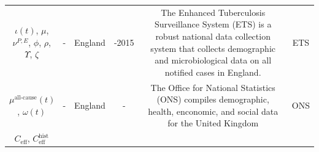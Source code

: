 \documentclass[11pt,twoside]{bristolthesis}
\begin{document}
\begin{longtable}[]{@{}cccccc@{}}
  \midrule
  \endhead
  \begin{minipage}[t]{0.21\columnwidth}\centering
  \(\iota(t)\),
  \(\mu\), \(\nu^{P, E}\), \(\phi\),
  \(\rho\),
  \(\Upsilon\),
  \(\zeta\)\strut
  \end{minipage} & \begin{minipage}[t]{0.10\columnwidth}\centering
  -\strut
  \end{minipage} & \begin{minipage}[t]{0.07\columnwidth}\centering
  England\strut
  \end{minipage} & \begin{minipage}[t]{0.07\columnwidth}\centering
  2000-2015\strut
  \end{minipage} & \begin{minipage}[t]{0.27\columnwidth}\centering
  The Enhanced Tuberculosis Surveillance
  System (ETS) is a robust national data
  collection system that collects
  demographic and microbiological data on
  all notified cases in England.\strut
  \end{minipage} & \begin{minipage}[t]{0.11\columnwidth}\centering
  ETS\strut
  \end{minipage}\tabularnewline
  \begin{minipage}[t]{0.21\columnwidth}\centering
  \(\mu^{\text{all-cause}}(t)\),
  \(\omega(t)\)\strut
  \end{minipage} & \begin{minipage}[t]{0.10\columnwidth}\centering
  -\strut
  \end{minipage} & \begin{minipage}[t]{0.07\columnwidth}\centering
  England\strut
  \end{minipage} & \begin{minipage}[t]{0.07\columnwidth}\centering
  -\strut
  \end{minipage} & \begin{minipage}[t]{0.27\columnwidth}\centering
  The Office for National Statistics (ONS)
  compiles demographic, health, enconomic,
  and social data for the United Kingdom\strut
  \end{minipage} & \begin{minipage}[t]{0.11\columnwidth}\centering
  ONS\strut
  \end{minipage}\tabularnewline
  \begin{minipage}[t]{0.21\columnwidth}\centering
  \(C_{\text{eff}}\),
  \(C^{\text{hist}}_{\text{eff}}\)\strut
  \end{minipage} & \begin{minipage}[t]{0.10\columnwidth}\centering

\end{minipage}
\end{longtable}
\end{document}

